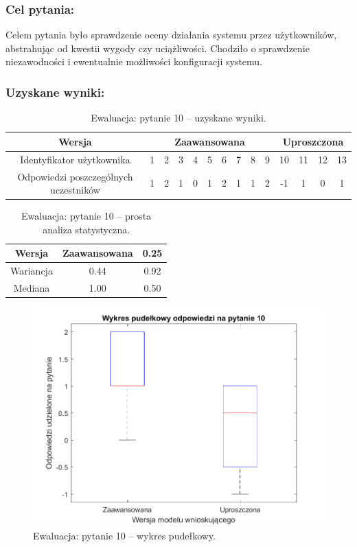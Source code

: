 	\subsubsection{Cel pytania:}
	
	Celem pytania było sprawdzenie oceny działania systemu przez użytkowników, abstrahując od kwestii wygody czy uciążliwości. Chodziło o sprawdzenie niezawodności i ewentualnie możliwości konfiguracji systemu.
	
	\subsubsection{Uzyskane wyniki:}
	
	\begin{table}[!h]
		\caption{Ewaluacja: pytanie 10 -- uzyskane wyniki.}
		\centering
		\begin{tabular}{|c|c|c|c|c|c|c|c|c|c|c|c|c|c|}
			\hline
			Wersja &  \multicolumn{9}{c|}{Zaawansowana} & \multicolumn{4}{c|}{Uproszczona}\\ \hline
			Identyfikator użytkownika             & 1 & 2 & 3 & 4 & 5 & 6 & 7 & 8 & 9 
			& 10 & 11 & 12 & 13 \\ \hline
			Odpowiedzi poszczególnych uczestników & 1 & 2 & 1 & 0 & 1 & 2 & 1 & 1 & 2
			& -1 & 1 & 0 & 1    \\ \hline
		\end{tabular}
	\end{table}
	
	\begin{table}[!h]
		\caption{Ewaluacja: pytanie 10 -- prosta analiza statystyczna.}
		\centering
		\begin{tabular}{|c|c|c|}
			\hline
			Wersja          & Zaawansowana & 0.25        \\ \hline
			Wariancja       & 0.44         & 0.92        \\ \hline
			Mediana         & 1.00         & 0.50        \\ \hline
		\end{tabular}
	\end{table}
	
	\begin{figure}[H]
		\centering
		\includegraphics[scale=0.8]{rozdzial5/Ewaluacja10.png}
		\caption{Ewaluacja: pytanie 10 -- wykres pudełkowy.}
	\end{figure}
	
